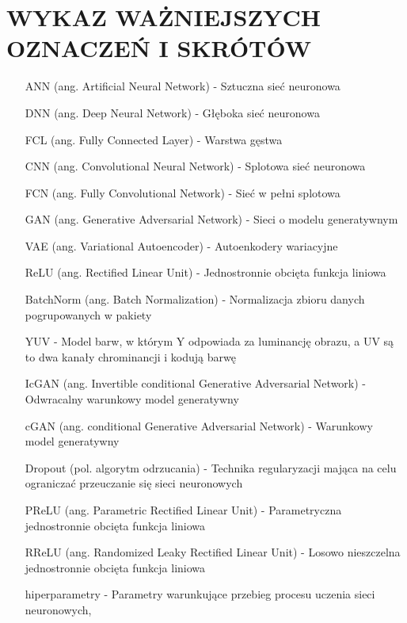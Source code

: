 \section*{WYKAZ WAŻNIEJSZYCH OZNACZEŃ I SKRÓTÓW}

  \bigskip

  \begin{itemize}
    \item[ANN] (ang. Artificial Neural Network) - Sztuczna sieć neuronowa
    \item[DNN] (ang. Deep Neural Network) - Głęboka sieć neuronowa
    \item[FCL] (ang. Fully Connected Layer) - Warstwa gęstwa
    \item[CNN] (ang. Convolutional Neural Network) - Splotowa sieć neuronowa
    \item[FCN] (ang. Fully Convolutional Network) - Sieć w pełni splotowa
    \item[GAN] (ang. Generative Adversarial Network) - Sieci o modelu generatywnym
    \item[VAE] (ang. Variational Autoencoder) - Autoenkodery wariacyjne
    \item[ReLU] (ang. Rectified Linear Unit) - Jednostronnie obcięta funkcja liniowa
    \item[BatchNorm] (ang. Batch Normalization) - Normalizacja zbioru danych
    pogrupowanych w pakiety
    \item[YUV] - Model barw, w którym Y odpowiada za luminancję obrazu, a UV
    są to dwa kanały chrominancji i kodują barwę
    \item[IcGAN] (ang. Invertible conditional Generative Adversarial Network) -
    Odwracalny warunkowy model generatywny
    \item[cGAN] (ang. conditional Generative Adversarial Network) - Warunkowy
    model generatywny
    \item[Dropout] (pol. algorytm odrzucania) - Technika
    regularyzacji mająca na celu ograniczać przeuczanie się sieci neuronowych
    \item[PReLU] (ang. Parametric Rectified Linear Unit) - Parametryczna
    jednostronnie obcięta funkcja liniowa
    \item[RReLU] (ang. Randomized Leaky Rectified Linear Unit) - Losowo nieszczelna
    jednostronnie obcięta funkcja liniowa
    \item[hiperparametry] - Parametry warunkujące przebieg procesu uczenia sieci neuronowych,

\end{itemize}
